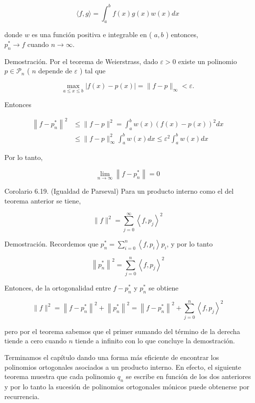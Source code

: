 \documentclass[10pt]{book}
\begin{document}
$$
\langle f, g\rangle=\int_{a}^{b} f(x) g(x) w(x) d x
$$

donde $w$ es una función positiva e integrable en ( $a, b$ ) entonces,\\
$p_{n}^{*} \longrightarrow f$ cuando $n \longrightarrow \infty$.

Demostración. Por el teorema de Weierstrass, dado $\varepsilon>0$ existe un polinomio $p \in \mathcal{P}_{n}$ ( $n$ depende de $\varepsilon$ ) tal que

$$
\max _{a \leq x \leq b}|f(x)-p(x)|=\|f-p\|_{\infty}<\varepsilon .
$$

Entonces

$$
\begin{aligned}
\left\|f-p_{n}^{*}\right\|^{2} & \leq\|f-p\|^{2}=\int_{a}^{b} w(x)(f(x)-p(x))^{2} d x \\
& \leq\|f-p\|_{\infty}^{2} \int_{a}^{b} w(x) d x \leq \varepsilon^{2} \int_{a}^{b} w(x) d x
\end{aligned}
$$

Por lo tanto,

$$
\lim _{n \rightarrow \infty}\left\|f-p_{n}^{*}\right\|=0
$$

Corolario 6.19. (Igualdad de Parseval) Para un producto interno como el del teorema anterior se tiene,

$$
\|f\|^{2}=\sum_{j=0}^{\infty}\left\langle f, p_{j}\right\rangle^{2}
$$

Demostración. Recordemos que $p_{n}^{*}=\sum_{i=0}^{n}\left\langle f, p_{i}\right\rangle p_{i}$, y por lo tanto

$$
\left\|p_{n}^{*}\right\|^{2}=\sum_{j=0}^{n}\left\langle f, p_{j}\right\rangle^{2}
$$

Entonces, de la ortogonalidad entre $f-p_{n}^{*}$ y $p_{n}^{*}$ se obtiene

$$
\|f\|^{2}=\left\|f-p_{n}^{*}\right\|^{2}+\left\|p_{n}^{*}\right\|^{2}=\left\|f-p_{n}^{*}\right\|^{2}+\sum_{j=0}^{n}\left\langle f, p_{j}\right\rangle^{2}
$$

pero por el teorema sabemos que el primer sumando del término de la derecha tiende a cero cuando $n$ tiende a infinito con lo que concluye la demostración.

Terminamos el capítulo dando una forma más eficiente de encontrar los polinomios ortogonales asociados a un producto interno. En efecto, el siguiente teorema muestra que cada polinomio $q_{n}$ se escribe en función de los dos anteriores y por lo tanto la sucesión de polinomios ortogonales mónicos puede obtenerse por recurrencia.
\end{document}
